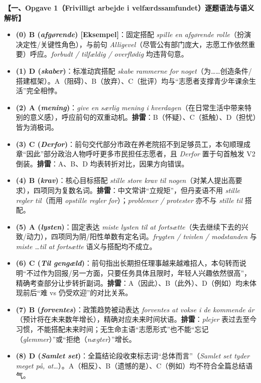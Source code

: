 \begin{answerbox}
\textbf{\color{NCDNavy}【一、Opgave 1（Frivilligt arbejde i velfærdssamfundet）逐题语法与语义解析】}
\begin{itemize}
  \item \textbf{(0) B (\textit{afgørende}) [Eksempel]}：固定搭配 \textit{spille en afgørende rolle}（扮演决定性/关键性角色），与前句 \textit{Alligevel}（尽管公有部门庞大，志愿工作依然重要）呼应。\textit{forbudt / tilfældig / overflødig} 均违背句意。
  \item \textbf{(1) D (\textit{skaber})}：标准动宾搭配 \textit{skabe rammerne for noget}（为……创造条件/搭建框架）。A（阻碍）、B（放弃）、C（批评）均与“志愿者支撑青少年课余生活”完全相悖。
  \item \textbf{(2) A (\textit{mening})}：\textit{give en særlig mening i hverdagen}（在日常生活中带来特别的意义感），呼应前句的双重动机。\textbf{排雷}：B（怀疑）、C（抵触）、D（担忧）皆为消极词。
  \item \textbf{(3) C (\textit{Derfor})}：前句交代部分市政在养老院招不到足够员工，本句顺理成章“因此”部分政治人物呼吁更多市民担任志愿者，且 \textit{Derfor} 置于句首触发 V2 倒装。\textbf{排雷}：A、B、D 均表转折对比，因果方向错误。
  \item \textbf{(4) B (\textit{krav})}：核心目标搭配 \textit{stille store krav til nogen}（对某人提出高要求），四项同为复数名词。\textbf{排雷}：中文常讲“立规矩”，但丹麦语不用 \textit{stille regler til}（而用 \textit{opstille regler for}）；\textit{problemer / protester} 亦不与 \textit{stille til} 搭配。
  \item \textbf{(5) A (\textit{lysten})}：固定表达 \textit{miste lysten til at fortsætte}（失去继续下去的兴致/动力），四项同为阴/阳性单数有定名词。\textit{frygten / tvivlen / modstanden} 与 \textit{miste \ldots til at fortsætte} 语义与搭配均不成立。
  \item \textbf{(6) C (\textit{Til gengæld})}：前句指出长期担任理事越来越难招人，本句转而说明“不过作为回报/另一方面，只要任务具体且限时，年轻人兴趣依然很高”，精确考查部分让步转折副词。\textbf{排雷}：A（因此）、B（此外）、D（例如）均未体现前后“难 vs 仍受欢迎”的对比关系。
  \item \textbf{(7) B (\textit{forventes})}：政策趋势被动表达 \textit{forventes at vokse i de kommende år}（预计将在未来数年增长），精确对应未来时间状语。\textbf{排雷}：\textit{plejer} 表过去至今习惯，不能搭配未来时间；无生命主语“志愿形式”也不能“忘记（\textit{glemmer}）”或“拒绝（\textit{nægter}）”增长。
  \item \textbf{(8) D (\textit{Samlet set})}：全篇结论段收束标志词“总体而言”（\textit{Samlet set tyder meget på, at\ldots}）。A（相反）、B（遗憾的是）、C（例如）均不符合全篇总结语气。
\end{itemize}
\end{answerbox}

